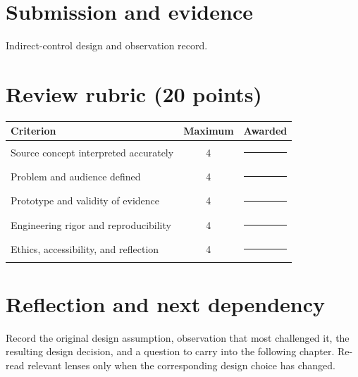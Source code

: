 \documentclass[11pt]{article}
\begin{document}
\section{Submission and evidence}
Indirect-control design and observation record.


\section{Review rubric (20 points)}
\begin{tabularx}{\linewidth}{@{}Xcc@{}}\toprule
Criterion & Maximum & Awarded \\ \midrule
Source concept interpreted accurately & 4 & \rule{0.45in}{0.4pt}\\
Problem and audience defined & 4 & \rule{0.45in}{0.4pt}\\
Prototype and validity of evidence & 4 & \rule{0.45in}{0.4pt}\\
Engineering rigor and reproducibility & 4 & \rule{0.45in}{0.4pt}\\
Ethics, accessibility, and reflection & 4 & \rule{0.45in}{0.4pt}\\\bottomrule
\end{tabularx}

\section{Reflection and next dependency}
Record the original design assumption, observation that most challenged it, the resulting design decision, and a question to carry into the following chapter. Re-read relevant lenses only when the corresponding design choice has changed.
\end{document}
